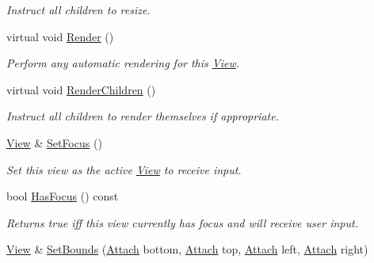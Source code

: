 \begin{DoxyCompactItemize}
\begin{DoxyCompactList}\small\item\em Instruct all children to resize. \end{DoxyCompactList}\item 
virtual void \hyperlink{structpangolin_1_1_view_a15bf43d7ebc4ebe4e02cba572f0d49ba}{Render} ()
\begin{DoxyCompactList}\small\item\em Perform any automatic rendering for this \hyperlink{structpangolin_1_1_view}{View}. \end{DoxyCompactList}\item 
virtual void \hyperlink{structpangolin_1_1_view_a909803ac383d29e33b68e45deade690a}{Render\+Children} ()\hypertarget{structpangolin_1_1_view_a909803ac383d29e33b68e45deade690a}{}\label{structpangolin_1_1_view_a909803ac383d29e33b68e45deade690a}

\begin{DoxyCompactList}\small\item\em Instruct all children to render themselves if appropriate. \end{DoxyCompactList}\item 
\hyperlink{structpangolin_1_1_view}{View} \& \hyperlink{structpangolin_1_1_view_ad2738287bfb37b837f5e9d5d787b81cd}{Set\+Focus} ()\hypertarget{structpangolin_1_1_view_ad2738287bfb37b837f5e9d5d787b81cd}{}\label{structpangolin_1_1_view_ad2738287bfb37b837f5e9d5d787b81cd}

\begin{DoxyCompactList}\small\item\em Set this view as the active \hyperlink{structpangolin_1_1_view}{View} to receive input. \end{DoxyCompactList}\item 
bool \hyperlink{structpangolin_1_1_view_ab16dcf4038a6e651956f286a5ac887d5}{Has\+Focus} () const \hypertarget{structpangolin_1_1_view_ab16dcf4038a6e651956f286a5ac887d5}{}\label{structpangolin_1_1_view_ab16dcf4038a6e651956f286a5ac887d5}

\begin{DoxyCompactList}\small\item\em Returns true iff this view currently has focus and will receive user input. \end{DoxyCompactList}\item 
\hyperlink{structpangolin_1_1_view}{View} \& \hyperlink{structpangolin_1_1_view_a86022aa9a3866ab1d4c77c5bca8fbfb9}{Set\+Bounds} (\hyperlink{structpangolin_1_1_attach}{Attach} bottom, \hyperlink{structpangolin_1_1_attach}{Attach} top, \hyperlink{structpangolin_1_1_attach}{Attach} left, \hyperlink{structpangolin_1_1_attach}{Attach} right)\hypertarget{structpangolin_1_1_view_a86022aa9a3866ab1d4c77c5bca8fbfb9}{}\label{structpangolin_1_1_view_a86022aa9a3866ab1d4c77c5bca8fbfb9}


\end{DoxyCompactItemize}
